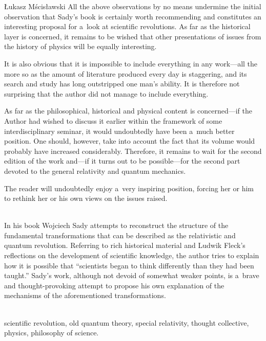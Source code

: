 \begin{newrevengenv}{Łukasz Mścisławski}
All the above observations by no means undermine the initial observation that Sady's book is certainly worth recommending and constitutes an interesting proposal for a~look at scientific revolutions. As far as the historical layer is concerned, it remains to be wished that other presentations of issues from the history of physics will be equally interesting.

It is also obvious that it is impossible to include everything in any work---all the more so as the amount of literature produced every day is staggering, and its search and study has long outstripped one man's ability. It is therefore not surprising that the author did not manage to include everything.

As far as the philosophical, historical and physical content is concerned---if the Author had wished to discuss it earlier within the framework of some interdisciplinary seminar, it would undoubtedly have been a~much better position. One should, however, take into account the fact that its volume would probably have increased considerably. Therefore, it remains to wait for the second edition of the work and---if it turns out to be possible---for the second part devoted to the general relativity and quantum mechanics.

The reader will undoubtedly enjoy a~very inspiring position, forcing her or him to rethink her or his own views on the issues raised.







\vspace{15mm}%
{}\\
{In his book Wojciech Sady attempts to reconstruct the structure of the fundamental transformations that can be described as the relativistic and quantum revolution. Referring to rich historical material and Ludwik Fleck's reflections on the development of scientific knowledge, the author tries to explain how it is possible that ``scientists began to think differently than they had been taught.'' Sady's work, although not devoid of somewhat weaker points, is a~brave and thought-provoking attempt to propose his own explanation of the mechanisms of the aforementioned transformations.}\par%
\vspace{2mm}%
{}\\
{scientific revolution, old quantum theory, special relativity, thought collective, physics, philosophy of science.}%



\end{newrevengenv}
